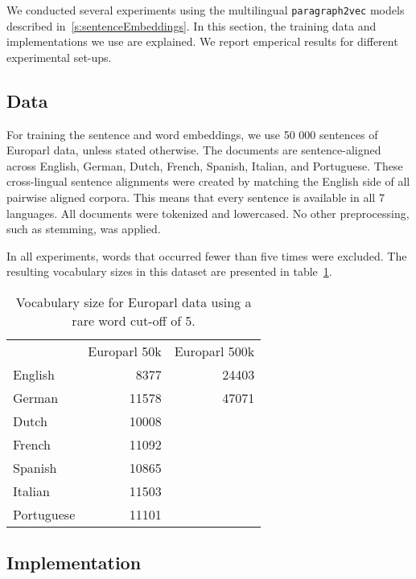 
We conducted several experiments using the multilingual \texttt{paragraph2vec} models described in~\ref{s:sentenceEmbeddings}. In this section, the training data and implementations we use are explained. We report emperical results for different experimental set-ups.



\subsection{Data}

For training the sentence and word embeddings, we use 50 000 sentences of Europarl data, unless stated otherwise.
The documents are sentence-aligned across English, German, Dutch, French, Spanish, Italian, and Portuguese.
These cross-lingual sentence alignments were created by matching the English side of all pairwise aligned corpora.
This means that every sentence is available in all 7 languages.
All documents were tokenized and lowercased. No other preprocessing, such as stemming, was applied.

In all experiments, words that occurred fewer than five times were excluded.
The resulting vocabulary sizes in this dataset are presented  in table~\ref{t:vocabularies}.

\begin{table}
\center
\begin{tabular}{l r r}
		&Europarl 50k 	&Europarl 500k\\
English	&8377			&24403	\\	
German	&11578		&47071	\\
Dutch		&10008				\\
French	&11092				\\	
Spanish	&10865				\\
Italian		&11503				\\
Portuguese	&11101				\\
\end{tabular}
\caption{Vocabulary size for Europarl data using a rare word cut-off of 5.}
\label{t:vocabularies}
\end{table}

\subsection{Implementation}


